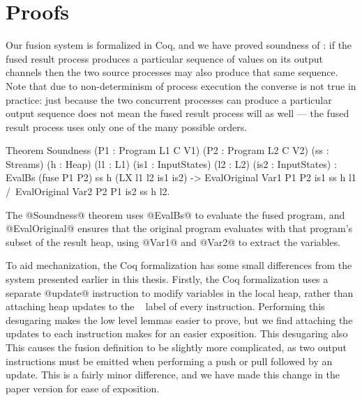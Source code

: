 
\chapter{Proofs}
\label{s:Proofs}

Our fusion system is formalized in Coq, and we have proved soundness of : if the fused result process produces a particular sequence of values on its output channels then the two source processes may also produce that same sequence. Note that due to non-determinism of process execution the converse is not true in practice: just because the two concurrent processes can produce a particular output sequence does not mean the fused result process will as well --- the fused result process uses only one of the many possible orders. 


\begin{code}
Theorem Soundness (P1 : Program L1 C V1) (P2  : Program L2 C V2)
                  (ss : Streams)         (h   : Heap)
                  (l1 : L1)              (is1 : InputStates)
                  (l2 : L2)              (is2 : InputStates) 
  :  EvalBs (fuse P1 P2) ss h (LX l1 l2 is1 is2)
  -> EvalOriginal Var1 P1 P2 is1 ss h l1
  /\ EvalOriginal Var2 P2 P1 is2 ss h l2.
\end{code}

The @Soundness@ theorem uses @EvalBs@ to evaluate the fused program, and @EvalOriginal@ ensures that the original program evaluates with that program's subset of the result heap, using @Var1@ and @Var2@ to extract the variables.


To aid mechanization, the Coq formalization has some small differences from the system presented earlier in this thesis.
Firstly, the Coq formalization uses a separate @update@ instruction to modify variables in the local heap, rather than attaching heap updates to the \Next~ label of every instruction.
Performing this desugaring makes the low level lemmas easier to prove, but we find attaching the updates to each instruction makes for an easier exposition.
This desugaring also 
This causes the fusion definition to be slightly more complicated, as two output instructions must be emitted when performing a push or pull followed by an update. This is a fairly minor difference, and we have made this change in the paper version for ease of exposition.

